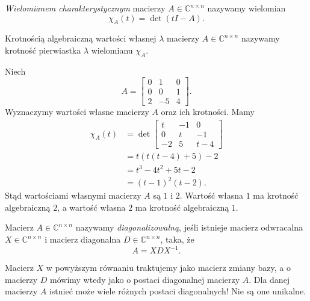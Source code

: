 \begin{definition}
	\textit{Wielomianem charakterystycznym} macierzy $A \in \mathbb{C}^{n \times n}$
		nazywamy wielomian
	\begin{equation}
		\chi_A(t) = \det(t I - A).
	\end{equation}
\end{definition}

\begin{definition}
	Krotnością algebraiczną wartości własnej $\lambda$ macierzy $A \in \mathbb{C}^{n \times n}$
		nazywamy krotność pierwiastka $\lambda$ wielomianu $\chi_A$.
\end{definition}

\begin{example}
	Niech
	\begin{equation}
		A = \left[\begin{matrix}
			0 & 1 & 0 \\
			0 & 0 & 1 \\
			2 & -5 & 4
		\end{matrix}\right].
	\end{equation}
	Wyznaczymy wartości własne macierzy $A$ oraz ich krotności.
	Mamy
	\begin{align}
		\chi_A(t)
			&= \det\left[\begin{matrix}
				t & -1 & 0 \\
				0 & t & -1 \\
				-2 & 5 & t - 4
			\end{matrix}\right] \\
			&= t(t(t - 4) + 5) - 2 \\
			&= t^3 - 4t^2 + 5t - 2 \\
			&= (t - 1)^2(t - 2).
	\end{align}
	Stąd wartościami własnymi macierzy $A$ są $1$ i $2$.
	Wartość własna $1$ ma krotność algebraiczną $2$,
	a wartość własna $2$ ma krotność algebraiczną $1$.
\end{example}



\begin{definition}
	Macierz $A \in \mathbb{C}^{n \times n}$ nazywamy \textit{diagonalizowalną},
		jeśli istnieje macierz odwracalna $X \in \mathbb{C}^{n \times n}$
		i macierz diagonalna $D \in \mathbb{C}^{n \times n}$,
		taka, że
	\begin{equation}
		A = X D X^{-1}.
	\end{equation}
\end{definition}
Macierz $X$ w powyższym równaniu traktujemy jako macierz zmiany bazy,
	a o macierzy $D$ mówimy wtedy jako o postaci diagonalnej macierzy $A$.
Dla danej macierzy $A$ istnieć może wiele różnych postaci diagonalnych!
Nie są one unikalne.

